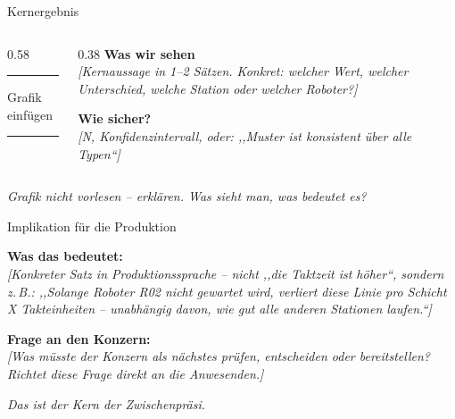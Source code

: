 \documentclass[aspectratio=169, 11pt]{beamer}
\newcommand{\hinweis}[1]{%
  \vspace{4pt}%
  {\scriptsize\color{mutedtext}\textit{#1}}%
}
\begin{document}
\begin{frame}{Kernergebnis}

  \begin{columns}[T, onlytextwidth]
    \begin{column}{0.58\textwidth}
      \begin{center}
        \textcolor{rulecolor}{\rule{\linewidth}{0.4pt}}
        \vspace{1.2cm}
        {\small\textcolor{mutedtext}{Grafik einfügen}}
        \vspace{1.2cm}
        \textcolor{rulecolor}{\rule{\linewidth}{0.4pt}}
      \end{center}
    \end{column}

    \begin{column}{0.38\textwidth}
      \textbf{Was wir sehen}\\[6pt]
      {\small\textit{[Kernaussage in 1--2 Sätzen.
      Konkret: welcher Wert, welcher Unterschied,
      welche Station oder welcher Roboter?]}}

      \vspace{10pt}
      \textbf{Wie sicher?}\\[6pt]
      {\small\textit{[N, Konfidenzintervall, oder:
      ,,Muster ist konsistent über alle Typen``]}}
    \end{column}
  \end{columns}

  \hinweis{Grafik nicht vorlesen -- erklären. Was sieht man, was bedeutet es?}

\end{frame}

\begin{frame}{Implikation für die Produktion}

  \vspace{4pt}
  \textbf{Was das bedeutet:}\\[8pt]
  {\normalsize\textit{[Konkreter Satz in Produktionssprache -- nicht
  ,,die Taktzeit ist höher``, sondern z.\,B.:
  ,,Solange Roboter R02 nicht gewartet wird, verliert diese Linie
  pro Schicht X Takteinheiten -- unabhängig davon, wie
  gut alle anderen Stationen laufen.``]}}

  \vspace{14pt}
  \textbf{Frage an den Konzern:}\\[6pt]
  {\small\textit{[Was müsste der Konzern als nächstes prüfen,
  entscheiden oder bereitstellen?
  Richtet diese Frage direkt an die Anwesenden.]}}

  \hinweis{Das ist der Kern der Zwischenpräsi.}

\end{frame}
\end{document}
